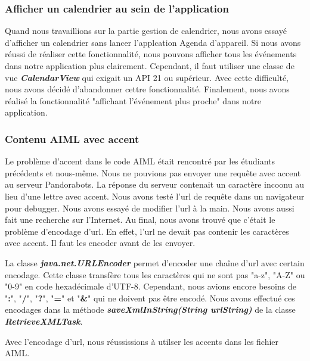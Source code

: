 \subsubsection{Afficher un calendrier au sein de l'application}

\indent Quand nous travaillions sur la partie gestion de calendrier, nous avons essayé d'afficher un calendrier sans lancer l'applcation Agenda d'appareil. Si nous avons réussi de réaliser cette fonctionnalité, nous pouvons afficher tous les événements dans notre application plus clairement. Cependant, il faut utiliser une classe de vue \textbf{\emph{CalendarView}} qui exigait un API 21 ou supérieur. Avec cette difficulté, nous avons décidé d'abandonner cettre fonctionnalité. Finalement, nous avons réalisé la fonctionnalité "affichant l'événement plus proche" dans notre application. 

\subsubsection{Contenu AIML avec accent}

\indent Le problème d'accent dans le code AIML était rencontré par les étudiants précédents et nous-même. Nous ne pouvions pas envoyer une requête avec accent au serveur Pandorabots. La réponse du serveur contenait un caractère incoonu au lieu d'une lettre avec accent. Nous avons testé l'url de requête dans un navigateur pour debugger. Nous avons essayé de modifier l'url à la main. Nous avons aussi fait une recherche sur l'Internet. Au final, nous avons trouvé que c'était le problème d'encodage d'url. En effet, l'url ne devait pas contenir les caractères avec accent. Il faut les encoder avant de les envoyer.

\indent La classe \textbf{\emph{java.net.URLEncoder}} permet d'encoder une chaîne d'url avec certain encodage. Cette classe transfère tous les caractères qui ne sont pas "a-z", "A-Z" ou "0-9" en code hexadécimale d'UTF-8. Cependant, nous avions encore besoins de "\textbf{:}", "\textbf{/}", "\textbf{?}", "\textbf{=}" et "\textbf{\&}" qui ne doivent pas être encodé. Nous avons effectué ces encodages dans la méthode \textbf{\emph{saveXmlInString(String urlString)}} de la classe \textbf{\emph{RetrieveXMLTask}}. 

\indent Avec l'encodage d'url, nous réussissions à utilser les accents dans les fichier AIML.

\newpage
